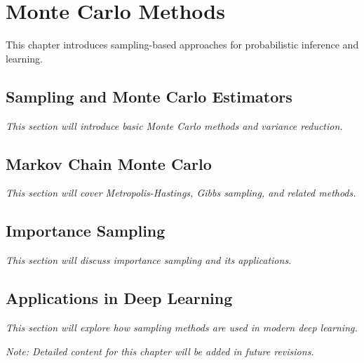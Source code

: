 
\chapter{Monte Carlo Methods}
\label{chap:monte-carlo}

This chapter introduces sampling-based approaches for probabilistic inference and learning.

\section{Sampling and Monte Carlo Estimators}

\textit{This section will introduce basic Monte Carlo methods and variance reduction.}

\section{Markov Chain Monte Carlo}

\textit{This section will cover Metropolis-Hastings, Gibbs sampling, and related methods.}

\section{Importance Sampling}

\textit{This section will discuss importance sampling and its applications.}

\section{Applications in Deep Learning}

\textit{This section will explore how sampling methods are used in modern deep learning.}

\vspace{1em}
\noindent\textit{Note: Detailed content for this chapter will be added in future revisions.}
